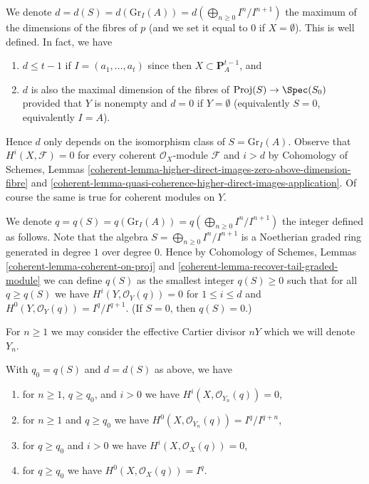 \medskip\noindent
We denote
$d = d(S) = d(\text{Gr}_I(A)) = d(\bigoplus_{n \geq 0} I^n/I^{n + 1})$
the maximum of the dimensions of the fibres of $p$
(and we set it equal to $0$ if $X = \emptyset$).
This is well defined. In fact, we have
\begin{enumerate}
\item $d \leq t - 1$ if $I = (a_1, \ldots, a_t)$ since then
$X \subset \mathbf{P}^{t - 1}_A$, and
\item $d$ is also the maximal dimension of the fibres of
$\text{Proj}(S) \to \Spec(S_0)$ provided that $Y$
is nonempty and $d = 0$ if $Y = \emptyset$
(equivalently $S = 0$, equivalently $I = A$).
\end{enumerate}
Hence $d$ only depends on the isomorphism class of $S = \text{Gr}_I(A)$.
Observe that $H^i(X, \mathcal{F}) = 0$ for every coherent
$\mathcal{O}_X$-module $\mathcal{F}$ and $i > d$ by
Cohomology of Schemes, Lemmas
\ref{coherent-lemma-higher-direct-images-zero-above-dimension-fibre} and
\ref{coherent-lemma-quasi-coherence-higher-direct-images-application}.
Of course the same is true for coherent modules on $Y$.

\medskip\noindent
We denote
$q = q(S) = q(\text{Gr}_I(A)) = q(\bigoplus_{n \geq 0} I^n/I^{n + 1})$
the integer defined as follows. Note that the algebra
$S = \bigoplus_{n \geq 0} I^n/I^{n + 1}$
is a Noetherian graded ring generated in degree $1$ over degree $0$.
Hence by
Cohomology of Schemes, Lemmas \ref{coherent-lemma-coherent-on-proj} and
\ref{coherent-lemma-recover-tail-graded-module} we can define $q(S)$
as the smallest integer $q(S) \geq 0$ such that for all $q \geq q(S)$ we have
$H^i(Y, \mathcal{O}_Y(q)) = 0$ for $1 \leq i \leq d$ and
$H^0(Y, \mathcal{O}_Y(q)) = I^q/I^{q + 1}$.
(If $S = 0$, then $q(S) = 0$.)

\medskip\noindent
For $n \geq 1$ we may consider the effective Cartier divisor $nY$
which we will denote $Y_n$.

\begin{lemma}
\label{lemma-bound-q-and-d}
With $q_0 = q(S)$ and $d = d(S)$ as above, we have
\begin{enumerate}
\item for $n \geq 1$, $q \geq q_0$, and $i > 0$ we have
$H^i(X, \mathcal{O}_{Y_n}(q)) = 0$,
\item for $n \geq 1$ and $q \geq q_0$ we have
$H^0(X, \mathcal{O}_{Y_n}(q)) = I^q/I^{q + n}$,
\item for $q \geq q_0$ and $i > 0$ we have
$H^i(X, \mathcal{O}_X(q)) = 0$,
\item for $q \geq q_0$ we have
$H^0(X, \mathcal{O}_X(q)) = I^q$.
\end{enumerate}
\end{lemma}

